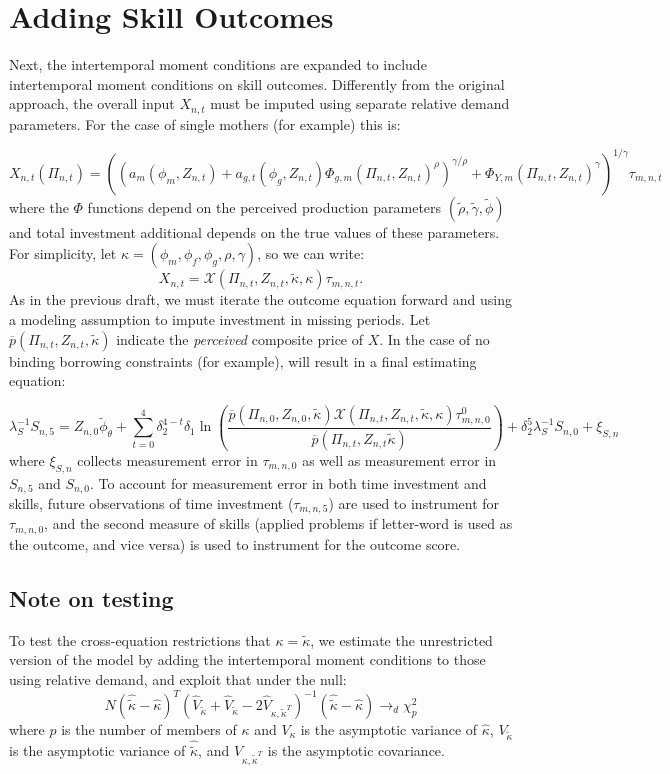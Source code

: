 \documentclass{article}
\begin{document}
\section*{Adding Skill Outcomes}

Next, the intertemporal moment conditions are expanded to include intertemporal moment conditions on skill outcomes. Differently from the original approach, the overall input $X_{n,t}$ must be imputed using separate relative demand parameters. For the case of single mothers (for example) this is:

\[ X_{n,t}(\Pi_{n,t}) = \left(\left(a_{m}(\phi_{m},Z_{n,t}) + a_{g,t}(\phi_{g},Z_{n,t})\Phi_{g,m}(\Pi_{n,t},Z_{n,t})^\rho\right)^{\gamma/
\rho} + \Phi_{Y,m}(\Pi_{n,t},Z_{n,t})^\gamma\right)^{1/\gamma}\tau_{m,n,t}
 \]
where the $\Phi$ functions depend on the perceived production parameters $(\tilde{\rho},\tilde{\gamma},\tilde{\phi})$ and total investment additional depends on the true values of these parameters. For simplicity, let $\kappa=(\phi_{m},\phi_{f},\phi_{g},\rho,\gamma)$, so we can write:
\[ X_{n,t} = \mathcal{X}(\Pi_{n,t},Z_{n,t},\tilde{\kappa},\kappa)\tau_{m,n,t}.\]
As in the previous draft, we must iterate the outcome equation forward and using a modeling assumption to impute investment in missing periods. Let $\overline{p}(\Pi_{n,t},Z_{n,t},\tilde{\kappa})$ indicate the \emph{perceived} composite price of $X$. In the case of no binding borrowing constraints (for example), will result in a final estimating equation:

\[\lambda^{-1}_{S}S_{n,5} = Z_{n,0}\tilde{\phi}_\theta + \sum_{t=0}^4\delta_{2}^{4-t}\delta_{1}\ln\left(\frac{\overline{p}(\Pi_{n,0},Z_{n,0},\tilde{\kappa})\mathcal{X}(\Pi_{n,t},Z_{n,t},\tilde{\kappa},\kappa)\tau^0_{m,n,0}}{\overline{p}(\Pi_{n,t},Z_{n,t}\tilde{\kappa})}\right) + \delta^5_{2}\lambda_{S}^{-1}S_{n,0} + \xi_{S,n} \]
where $\xi_{S,n}$ collects measurement error in $\tau_{m,n,0}$ as well as measurement error in $S_{n,5}$ and $S_{n,0}$. To account for measurement error in both time investment and skills, future observations of time investment ($\tau_{m,n,5}$) are used to instrument for $\tau_{m,n,0}$, and the second measure of skills (applied problems if letter-word is used as the outcome, and vice versa) is used to instrument for the outcome score.

\subsection*{Note on testing}
To test the cross-equation restrictions that $\kappa=\tilde{\kappa}$, we estimate the unrestricted version of the model by adding the intertemporal moment conditions to those using relative demand, and exploit that under the null:
\[ N(\hat{\tilde{\kappa}} - \hat{\kappa})^{T}(\hat{V}_{\tilde{\kappa}} + \hat{V}_{\tilde{\kappa}} -2\hat{V}_{\kappa,\tilde{\kappa}^{T}})^{-1}(\hat{\tilde{\kappa}} - \hat{\kappa}) \rightarrow_{d}\chi^2_{p} \]
where $p$ is the number of members of $\kappa$ and $V_{\kappa}$ is the asymptotic variance of $\hat{\kappa}$, $V_{\tilde{\kappa}}$ is the asymptotic variance of $\hat{\tilde{\kappa}}$, and $V_{\kappa,\tilde{\kappa}^{T}}$ is the asymptotic covariance.
\end{document}
